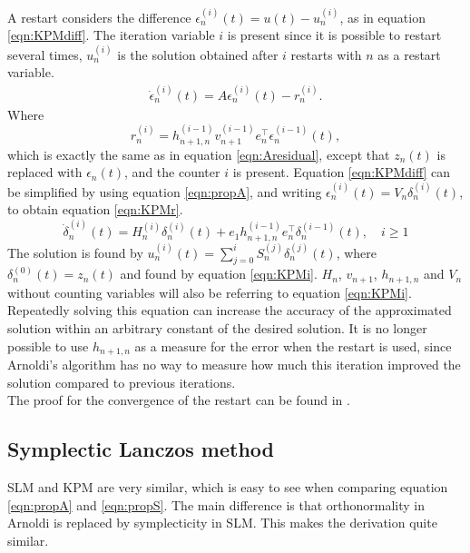A restart considers the difference $\epsilon_n^{(i)}(t) = u(t)-u_n^{(i)}$, as in equation \eqref{eqn:KPMdiff}. The iteration variable $i$ is present since it is possible to restart several times, $u_n^{(i)}$ is the solution obtained after $i$ restarts with $n$ as a restart variable. 
\begin{equation}
\begin{aligned}
\dot{\epsilon}_n^{(i)}(t)=A \epsilon_n^{(i)} (t)  - r_n^{(i)}.
\end{aligned}
\label{eqn:KPMdiff}
\end{equation}
Where 
\begin{equation}
r_n^{(i)} = h_{n+1,n}^{(i-1)} v_{n+1}^{(i-1)} e_n^{\top} \epsilon_n^{(i-1)} (t),
\end{equation}
which is exactly the same as in equation \eqref{eqn:Aresidual}, except that $z_n(t)$ is replaced with $\epsilon_n(t)$, and the counter $i$ is present. 
Equation \eqref{eqn:KPMdiff} can be simplified by using equation \eqref{eqn:propA}, and writing $ \epsilon^{(i)}_n(t)  = V_n \delta_n^{(i)}(t) $, to obtain equation \eqref{eqn:KPMr}.
\begin{equation}
\dot{\delta}^{(i)}_n(t) = H_n^{(i)} \delta_n^{(i)}(t) + e_1 h_{n+1,n}^{(i-1)} e^\top_n \delta_n^{(i-1)}(t), \quad i \geq 1
\label{eqn:KPMr}
\end{equation}
The solution is found by $ u_n^{(i)}(t) = \sum \limits_{j = 0} ^i S_n^{(j)} \delta_n^{(j)} (t) $, where $\delta_n^{(0)} (t) = z_n(t)$ and found by equation \eqref{eqn:KPMi}. $H_n$, $v_{n+1}$, $h_{n+1,n}$ and $V_n$ without counting variables will also be referring to equation \eqref{eqn:KPMi}. \\
Repeatedly solving this equation can increase the accuracy of the approximated solution within an arbitrary constant of the desired solution. It is no longer possible to use $h_{n+1,n}$ as a measure for the error when the restart is used, since Arnoldi's algorithm has no way to measure how much this iteration improved the solution compared to previous iterations.\\

The proof for the convergence of the restart can be found in \cite{elenaconv}.\\
\subsection{Symplectic Lanczos method}
SLM and KPM are very similar, which is easy to see when comparing equation \eqref{eqn:propA} and \eqref{eqn:propS}. The main difference is that orthonormality in Arnoldi is replaced by symplecticity in SLM. This makes the derivation quite similar.\\

